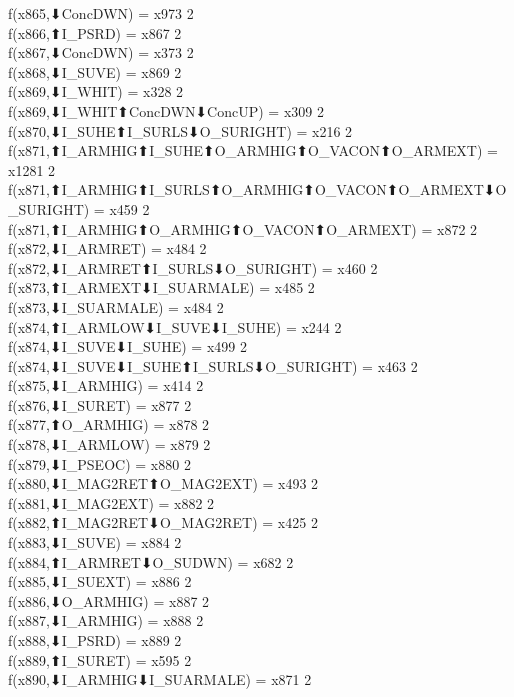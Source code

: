 f(x865,⬇ConcDWN) = x973 {2} \\
f(x866,⬆I_PSRD) = x867 {2} \\
f(x867,⬇ConcDWN) = x373 {2} \\
f(x868,⬇I_SUVE) = x869 {2} \\
f(x869,⬇I_WHIT) = x328 {2} \\
f(x869,⬇I_WHIT⬆ConcDWN⬇ConcUP) = x309 {2} \\
f(x870,⬇I_SUHE⬆I_SURLS⬇O_SURIGHT) = x216 {2} \\
f(x871,⬆I_ARMHIG⬆I_SUHE⬆O_ARMHIG⬆O_VACON⬆O_ARMEXT) = x1281 {2} \\
f(x871,⬆I_ARMHIG⬆I_SURLS⬆O_ARMHIG⬆O_VACON⬆O_ARMEXT⬇O_SURIGHT) = x459 {2} \\
f(x871,⬆I_ARMHIG⬆O_ARMHIG⬆O_VACON⬆O_ARMEXT) = x872 {2} \\
f(x872,⬇I_ARMRET) = x484 {2} \\
f(x872,⬇I_ARMRET⬆I_SURLS⬇O_SURIGHT) = x460 {2} \\
f(x873,⬆I_ARMEXT⬇I_SUARMALE) = x485 {2} \\
f(x873,⬇I_SUARMALE) = x484 {2} \\
f(x874,⬆I_ARMLOW⬇I_SUVE⬇I_SUHE) = x244 {2} \\
f(x874,⬇I_SUVE⬇I_SUHE) = x499 {2} \\
f(x874,⬇I_SUVE⬇I_SUHE⬆I_SURLS⬇O_SURIGHT) = x463 {2} \\
f(x875,⬇I_ARMHIG) = x414 {2} \\
f(x876,⬇I_SURET) = x877 {2} \\
f(x877,⬆O_ARMHIG) = x878 {2} \\
f(x878,⬇I_ARMLOW) = x879 {2} \\
f(x879,⬇I_PSEOC) = x880 {2} \\
f(x880,⬇I_MAG2RET⬆O_MAG2EXT) = x493 {2} \\
f(x881,⬇I_MAG2EXT) = x882 {2} \\
f(x882,⬆I_MAG2RET⬇O_MAG2RET) = x425 {2} \\
f(x883,⬇I_SUVE) = x884 {2} \\
f(x884,⬆I_ARMRET⬇O_SUDWN) = x682 {2} \\
f(x885,⬇I_SUEXT) = x886 {2} \\
f(x886,⬇O_ARMHIG) = x887 {2} \\
f(x887,⬇I_ARMHIG) = x888 {2} \\
f(x888,⬇I_PSRD) = x889 {2} \\
f(x889,⬆I_SURET) = x595 {2} \\
f(x890,⬇I_ARMHIG⬇I_SUARMALE) = x871 {2} \\
